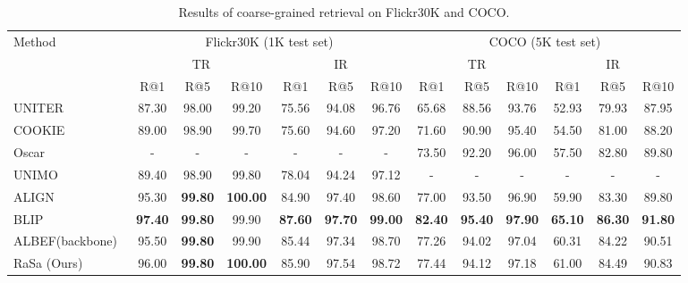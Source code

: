 \documentclass{article}
\begin{document}
\begin{table*}
\small
\renewcommand\arraystretch{1.2}
\setlength{\tabcolsep}{4.2pt}
\centering
\begin{tabular}{l|cccccc|cccccc} 
\hline
\multirow{3}{*}{Method} & \multicolumn{6}{c|}{Flickr30K (1K test set)}                & \multicolumn{6}{c}{COCO (5K test set)}                         \\
                        & \multicolumn{3}{c}{TR} & \multicolumn{3}{c|}{IR} & \multicolumn{3}{c}{TR} & \multicolumn{3}{c}{IR}  \\
                        & R@1   & R@5   & R@10   & R@1   & R@5   & R@10    & R@1   & R@5   & R@10   & R@1   & R@5   & R@10    \\ 
\hline
UNITER~\cite{chen2020uniter}    & 87.30 & 98.00 & 99.20 & 75.56 & 94.08 & 96.76   & 65.68 & 88.56 & 93.76  & 52.93 & 79.93 & 87.95   \\
COOKIE~\cite{wen2021cookie}     & 89.00 & 98.90 & 99.70 & 75.60 & 94.60 & 97.20   & 71.60 & 90.90 & 95.40  & 54.50 & 81.00 & 88.20   \\
Oscar~\cite{li2020oscar}        & - & - & - & - & - & -   & 73.50 & 92.20 & 96.00  & 57.50 & 82.80 & 89.80   \\
UNIMO~\cite{li2021unimo}        & 89.40 & 98.90 & 99.80 & 78.04 & 94.24 & 97.12   & - & - & -  & - & - & -   \\
ALIGN~\cite{jia2021scaling}     & 95.30 & \textbf{99.80} & \textbf{100.00} & 84.90 & 97.40 & 98.60   & 77.00 & 93.50 & 96.90  & 59.90 & 83.30 & 89.80   \\
BLIP~\cite{li2022blip}          & \textbf{97.40} & \textbf{99.80} & 99.90 & \textbf{87.60} & \textbf{97.70} & \textbf{99.00}   & \textbf{82.40} & \textbf{95.40} & \textbf{97.90}  & \textbf{65.10} & \textbf{86.30} & \textbf{91.80}   \\
\hline
ALBEF(backbone)~\cite{NEURIPS2021_50525975}                   & 95.50 & \textbf{99.80} & 99.90  & 85.44 & 97.34 & 98.70   & 77.26 & 94.02 & 97.04  & 60.31 & 84.22 & 90.51   \\
RaSa (Ours)                     & 96.00 & \textbf{99.80} & \textbf{100.00} & 85.90 & 97.54 & 98.72   & 77.44 & 94.12 & 97.18  & 61.00 & 84.49 & 90.83   \\
\hline
\end{tabular}
\caption{Results of coarse-grained retrieval on Flickr30K and COCO.}
\label{table5}
\end{table*}
\end{document}
